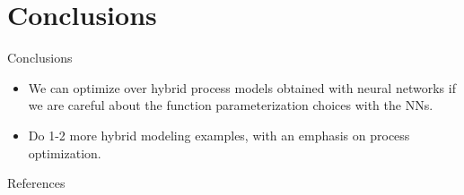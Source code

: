 \documentclass[xcolor=dvipsnames, 8pt]{beamer} %
\begin{document}
\section{Conclusions}
\begin{frame}{Conclusions}

	\begin{block}{}

	\begin{itemize}
		\item We can \alert{optimize over hybrid process models obtained with 
		neural networks} if we are careful about the function parameterization 
		choices with the NNs.
		\medskip
		\item Do 1-2 more hybrid modeling examples, with an emphasis on process 
		optimization.
	\end{itemize}

	\end{block}

\end{frame}

\begin{frame}{References}


\end{frame}
\end{document}
